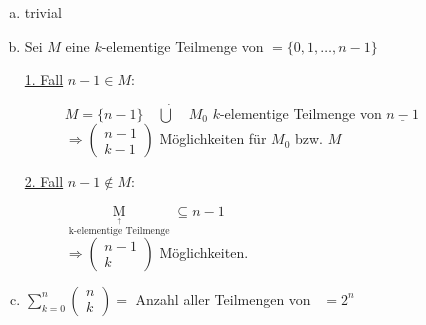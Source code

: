 \bws
\begin{enumerate}[a) ]
	\item trivial
	\item Sei $M$ eine $k$-elementige Teilmenge von \n$=\{0,1,\dotsc,n-1\}$
	\begin{description}
		\item[\underline{1. Fall} $n-1\in M:$] $M=\{n-1\} \quad \dot{\bigcup} \quad M_{0}$ $k$-elementige Teilmenge von $\underline{n-1}$\\
			$\Rightarrow \begin{pmatrix} n-1 \\ k-1 \end{pmatrix}$ Möglichkeiten für $M_{0}$ bzw. $M$
		\item[\underline{2. Fall} $n-1 \notin M:$] $\mathop{M}\limits_{\mathop{k\textrm{-elementige Teilmenge}}\limits^{\uparrow}} \subseteq n-1$ \\
			$\Rightarrow \begin{pmatrix} n-1 \\ k \end{pmatrix}$ Möglichkeiten.
	\end{description}
	\item $\sum\limits^{n}_{k=0}\begin{pmatrix} n \\ k \end{pmatrix} =$ Anzahl aller Teilmengen von \n  \, $= 2^{n}$
\end{enumerate}

